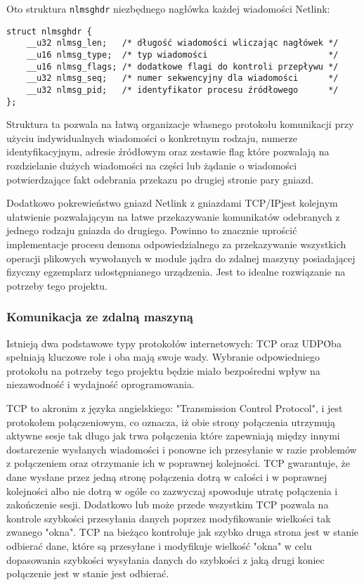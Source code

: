 \documentclass[10pt]{article}
\begin{document}
Oto struktura \texttt{nlmsghdr} niezbędnego nagłówka każdej wiadomości Netlink:

\begin{verbatim}
struct nlmsghdr {
    __u32 nlmsg_len;   /* długość wiadomości wliczając nagłówek */
    __u16 nlmsg_type;  /* typ wiadomości                        */
    __u16 nlmsg_flags; /* dodatkowe flagi do kontroli przepływu */
    __u32 nlmsg_seq;   /* numer sekwencyjny dla wiadomości      */
    __u32 nlmsg_pid;   /* identyfikator procesu źródłowego      */
};
\end{verbatim}

Struktura ta pozwala na łatwą organizacje własnego protokołu komunikacji przy użyciu indywidualnych wiadomości o konkretnym rodzaju, numerze identyfikacyjnym, adresie źródłowym oraz zestawie flag które pozwalają na rozdzielanie dużych wiadomości na części lub żądanie o wiadomości potwierdzające fakt odebrania przekazu po drugiej stronie pary gniazd.

Dodatkowo pokrewieństwo gniazd Netlink z gniazdami TCP/IP\@ jest kolejnym ułatwienie pozwalającym na łatwe przekazywanie komunikatów odebranych z jednego rodzaju gniazda do drugiego. Powinno to znacznie uprościć implementacje procesu demona odpowiedzialnego za przekazywanie wszystkich operacji plikowych wywołanych w module jądra do zdalnej maszyny posiadającej fizyczny egzemplarz udostępnianego urządzenia. Jest to idealne rozwiązanie na potrzeby tego projektu.

\subsubsection{Komunikacja ze zdalną maszyną}

Istnieją dwa podstawowe typy protokołów internetowych: TCP oraz UDP\. Oba spełniają kluczowe role i oba mają swoje wady. Wybranie odpowiedniego protokołu na potrzeby tego projektu będzie miało bezpośredni wpływ na niezawodność i wydajność oprogramowania.

TCP to akronim z języka angielskiego: "Transmission Control Protocol", i jest protokołem połączeniowym, co oznacza, iż obie strony połączenia utrzymują aktywne sesje tak długo jak trwa połączenia które zapewniają między innymi dostarczenie wysłanych wiadomości i ponowne ich przesyłanie w razie problemów z połączeniem oraz otrzymanie ich w poprawnej kolejności. TCP gwarantuje, że dane wysłane przez jedną stronę połączenia dotrą w całości i w poprawnej kolejności albo nie dotrą w ogóle co zazwyczaj spowoduje utratę połączenia i zakończenie sesji. Dodatkowo lub może przede wszystkim TCP pozwala na kontrole szybkości przesyłania danych poprzez modyfikowanie wielkości tak zwanego "okna". TCP na bieżąco kontroluje jak szybko druga strona jest w stanie odbierać dane, które są przesyłane i modyfikuje wielkość "okna" w celu dopasowania szybkości wysyłania danych do szybkości z jaką drugi koniec połączenie jest w stanie jest odbierać.
\end{document}
